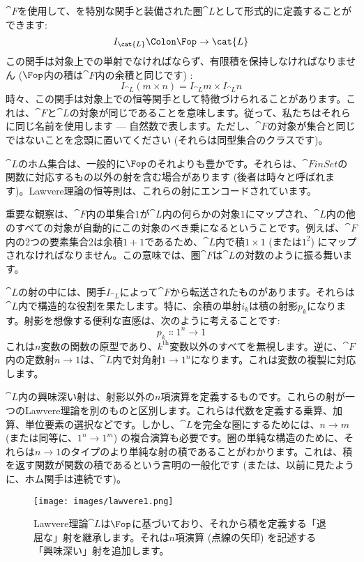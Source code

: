 $\cat{F}$を使用して、を特別な関手と装備された圏$\cat{L}$として形式的に定義することができます: 
\[I_{\cat{L}} \Colon \Fop \to \cat{L}\]
この関手は対象上での単射でなければならず、有限積を保持しなければなりません ($\Fop$内の積は$\cat{F}$内の余積と同じです) : 
\[I_{\cat{L}} (m\times{}n) = I_{\cat{L}} m\times{}I_{\cat{L}} n\]
時々、この関手は対象上での恒等関手として特徴づけられることがあります。これは、$\cat{F}$と$\cat{L}$の対象が同じであることを意味します。従って、私たちはそれらに同じ名前を使用します --- 自然数で表します。ただし、$\cat{F}$の対象が集合と同じではないことを念頭に置いてください (それらは同型集合のクラスです)。

$\cat{L}$のホム集合は、一般的に$\Fop$のそれよりも豊かです。それらは、$\cat{FinSet}$の関数に対応するもの以外の射を含む場合があります (後者は時々と呼ばれます)。Lawvere理論の恒等則は、これらの射にエンコードされています。

重要な観察は、$\cat{F}$内の単集合$1$が$\cat{L}$内の何らかの対象$1$にマップされ、$\cat{L}$内の他のすべての対象が自動的にこの対象のべき乗になるということです。例えば、$\cat{F}$内の2つの要素集合$2$は余積$1 + 1$であるため、$\cat{L}$内で積$1 \times 1$ (または$1^2$) にマップされなければなりません。この意味では、圏$\cat{F}$は$\cat{L}$の対数のように振る舞います。

$\cat{L}$の射の中には、関手$I_{\cat{L}}$によって$\cat{F}$から転送されたものがあります。それらは$\cat{L}$内で構造的な役割を果たします。特に、余積の単射$i_k$は積の射影$p_k$になります。射影を想像する便利な直感は、次のように考えることです: 
\[p_k \Colon 1^n \to 1\]
これは$n$変数の関数の原型であり、$k^\text{th}$変数以外のすべてを無視します。逆に、$\cat{F}$内の定数射$n \to 1$は、$\cat{L}$内で対角射$1 \to 1^n$になります。これは変数の複製に対応します。

$\cat{L}$内の興味深い射は、射影以外の$n$項演算を定義するものです。これらの射が一つのLawvere理論を別のものと区別します。これらは代数を定義する乗算、加算、単位要素の選択などです。しかし、$\cat{L}$を完全な圏にするためには、$n \to m$ (または同等に、$1^n \to 1^m$) の複合演算も必要です。圏の単純な構造のために、それらは$n \to 1$のタイプのより単純な射の積であることがわかります。これは、積を返す関数が関数の積であるという言明の一般化です (または、以前に見たように、ホム関手は連続です)。

\begin{figure}[H]
  \centering
  \texttt{[image: images/lawvere1.png]}
  \caption{Lawvere理論$\cat{L}$は$\Fop$に基づいており、それから積を定義する「退屈な」射を継承します。それは$n$項演算 (点線の矢印) を記述する「興味深い」射を追加します。}
\end{figure}

